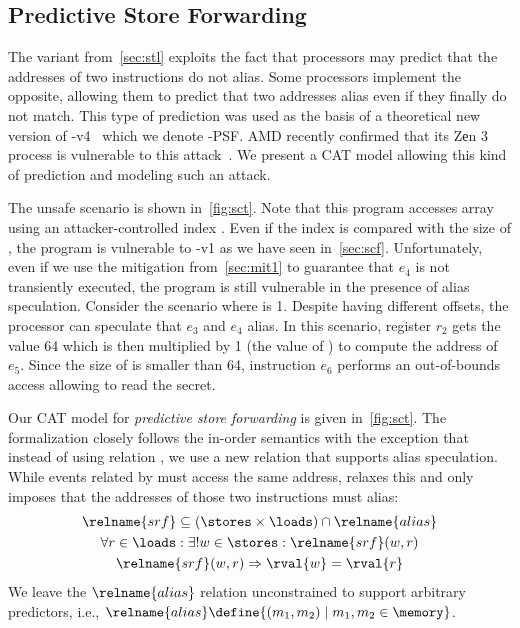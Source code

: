 \documentclass[conference]{IEEEtran}
\begin{document}
\subsection{Predictive Store Forwarding}
\label{sec:sct}

The \spectre variant from~\autoref{sec:stl} exploits the fact that processors may predict that the addresses of two instructions do not alias.
Some processors implement the opposite, allowing them to predict that two addresses alias even if they finally do not match.
This type of prediction was used as the basis of a theoretical new version of \spectre-v4~\cite{CauligiDGTSRB20,GuancialeBD20} which we denote \spectre-\textsc{PSF}.
AMD recently confirmed that its {\selectfont Z{е}n} 3 process is vulnerable to this attack~\cite{amd-sec2}. 
We present a CAT model allowing this kind of prediction and modeling such an attack.

The unsafe scenario is shown in~\autoref{fig:sct}.
Note that this program accesses array \varC using an attacker-controlled index \varidx.
Even if the index is compared with the size of \varC, the program is vulnerable to \spectre-v1 as we have seen in~\autoref{sec:scf}.
Unfortunately, even if we use the mitigation from~\autoref{sec:mit1} to guarantee that $e_4$ is not transiently executed, the program is still vulnerable in the presence of alias speculation.
Consider the scenario where \varidx is 1.
Despite having different offsets, the processor can speculate that $e_3$ and $e_4$ alias.
In this scenario, register $r_2$ gets the value 64 which is then multiplied by 1 (the value of \varidx) to compute the address of $e_5$.
Since the size of \varA is smaller than 64, instruction $e_6$ performs an out-of-bounds access allowing to read the secret.

Our CAT model for \emph{predictive store forwarding} is given in~\autoref{fig:sct}.
The formalization closely follows the in-order semantics with the exception that instead of using relation , we use a new relation that supports alias speculation.
While events related by  must access the same address,  relaxes this and only imposes that the addresses of those two instructions must alias: 
\begin{gather*}
\relname{srf} \subseteq (\stores \times \loads) \cap \relname{alias} \\ 
\forall r \in \loads : {\exists! w \in \stores : {\relname{srf}(w,r)}} \\
\relname{srf}(w,r) \Rightarrow \rval{w} = \rval{r}
\end{gather*}
\noindent
We leave the $\relname{alias}$ relation unconstrained to support arbitrary predictors, i.e., $\relname{alias} \define \{ (m_1,m_2) \mid m_1,m_2 \in \memory \}$.
\end{document}
